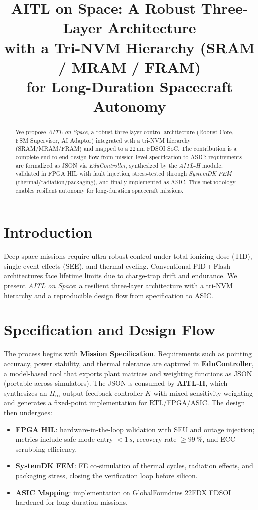 \documentclass[conference]{IEEEtran}
\title{AITL on Space: A Robust Three-Layer Architecture\\
with a Tri-NVM Hierarchy (SRAM / MRAM / FRAM)\\
for Long-Duration Spacecraft Autonomy}
\author{
\IEEEauthorblockN{Shinichi Samizo}
\IEEEauthorblockA{Independent Semiconductor Researcher\\
Former Engineer at Seiko Epson Corporation\\
Email: shin3t72@gmail.com\quad GitHub: \url{https://github.com/Samizo-AITL}}
}
\begin{document}
\maketitle

\begin{abstract}
We propose \emph{AITL on Space}, a robust three-layer control architecture (Robust Core, FSM Supervisor, AI Adaptor) integrated with a tri-NVM hierarchy (SRAM/MRAM/FRAM) and mapped to a 22\,nm FD\!SOI SoC. The contribution is a complete end-to-end design flow from mission-level specification to ASIC: requirements are formalized as JSON via \textit{EduController}, synthesized by the \textit{AITL-H} module, validated in FPGA HIL with fault injection, stress-tested through \textit{SystemDK FEM} (thermal/radiation/packaging), and finally implemented as ASIC. This methodology enables resilient autonomy for long-duration spacecraft missions.
\end{abstract}

\section{Introduction}
Deep-space missions require ultra-robust control under total ionizing dose (TID), single event effects (SEE), and thermal cycling. Conventional PID\,+\,Flash architectures face lifetime limits due to charge-trap drift and endurance. We present \textit{AITL on Space}: a resilient three-layer architecture with a tri-NVM hierarchy and a reproducible design flow from specification to ASIC.

\section{Specification and Design Flow}
The process begins with \textbf{Mission Specification}. Requirements such as pointing accuracy, power stability, and thermal tolerance are captured in \textbf{EduController}, a model-based tool that exports plant matrices and weighting functions as JSON (portable across simulators). The JSON is consumed by \textbf{AITL-H}, which synthesizes an $H_\infty$ output-feedback controller $K$ with mixed-sensitivity weighting and generates a fixed-point implementation for RTL/FPGA/ASIC. The design then undergoes:
\begin{itemize}
  \item \textbf{FPGA HIL}: hardware-in-the-loop validation with SEU and outage injection; metrics include safe-mode entry $<\SI{1}{s}$, recovery rate $\ge\SI{99}{\percent}$, and ECC scrubbing efficiency.
  \item \textbf{SystemDK FEM}: FE co-simulation of thermal cycles, radiation effects, and packaging stress, closing the verification loop before silicon.
  \item \textbf{ASIC Mapping}: implementation on GlobalFoundries 22FDX FD\!SOI hardened for long-duration missions.
\end{itemize}
\end{document}
